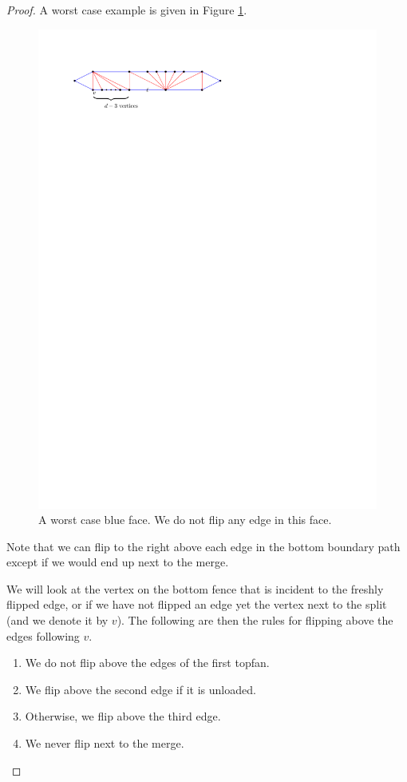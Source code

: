  \begin{proof}
  A worst case example is given in Figure \ref{fig:subdiv:worstCaseWithTopFan}.

  \begin{figure}[b]
    \centering
    \includegraphics[scale=1]{blueFaceSubdivision/img/worstCaseWithTopFan}
    \caption{A worst case blue face. We do not flip any edge in this face.}
    \label{fig:subdiv:worstCaseWithTopFan}
  \end{figure}

  Note that we can flip to the right above each edge in the bottom boundary path except if we would end up next to the merge.

  We will look at the vertex on the bottom fence that is incident to the freshly flipped edge, or if we have not flipped an edge yet the vertex next to the split (and we denote it by $v$). The following are then the rules for flipping above the edges following $v$.
  \begin{enumerate}
    \item We do not flip above the edges of the first topfan.
    \item We flip above the second edge if it is unloaded.
    \item Otherwise, we flip above the third edge.
    \item We never flip next to the merge.
  \end{enumerate}


\end{proof}

